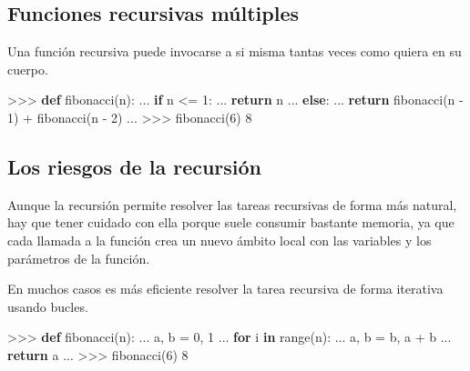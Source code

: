 \documentclass[
  spanish,
  a4paper,
]{scrreport}
\newenvironment{Shaded}{\begin{snugshade}}{\end{snugshade}}
\newcommand{\BuiltInTok}[1]{\textcolor[rgb]{0.00,0.23,0.31}{#1}}
\newcommand{\ControlFlowTok}[1]{\textcolor[rgb]{0.00,0.23,0.31}{\textbf{#1}}}
\newcommand{\DecValTok}[1]{\textcolor[rgb]{0.68,0.00,0.00}{#1}}
\newcommand{\KeywordTok}[1]{\textcolor[rgb]{0.00,0.23,0.31}{\textbf{#1}}}
\newcommand{\NormalTok}[1]{\textcolor[rgb]{0.00,0.23,0.31}{#1}}
\newcommand{\OperatorTok}[1]{\textcolor[rgb]{0.37,0.37,0.37}{#1}}
\begin{document}
\subsection{Funciones recursivas
múltiples}\label{funciones-recursivas-muxfaltiples}

Una función recursiva puede invocarse a si misma tantas veces como
quiera en su cuerpo.

\begin{Shaded}
\begin{Highlighting}[]
\OperatorTok{\textgreater{}\textgreater{}\textgreater{}} \KeywordTok{def}\NormalTok{ fibonacci(n):}
\NormalTok{...     }\ControlFlowTok{if}\NormalTok{ n }\OperatorTok{\textless{}=} \DecValTok{1}\NormalTok{:}
\NormalTok{...         }\ControlFlowTok{return}\NormalTok{ n}
\NormalTok{...     }\ControlFlowTok{else}\NormalTok{:}
\NormalTok{...         }\ControlFlowTok{return}\NormalTok{ fibonacci(n }\OperatorTok{{-}} \DecValTok{1}\NormalTok{) }\OperatorTok{+}\NormalTok{ fibonacci(n }\OperatorTok{{-}} \DecValTok{2}\NormalTok{)}
\NormalTok{...}
\OperatorTok{\textgreater{}\textgreater{}\textgreater{}}\NormalTok{ fibonacci(}\DecValTok{6}\NormalTok{)}
\DecValTok{8}
\end{Highlighting}
\end{Shaded}

\subsection{Los riesgos de la
recursión}\label{los-riesgos-de-la-recursiuxf3n}

Aunque la recursión permite resolver las tareas recursivas de forma más
natural, hay que tener cuidado con ella porque suele consumir bastante
memoria, ya que cada llamada a la función crea un nuevo ámbito local con
las variables y los parámetros de la función.

En muchos casos es más eficiente resolver la tarea recursiva de forma
iterativa usando bucles.

\begin{Shaded}
\begin{Highlighting}[]
\OperatorTok{\textgreater{}\textgreater{}\textgreater{}} \KeywordTok{def}\NormalTok{ fibonacci(n):}
\NormalTok{...     a, b }\OperatorTok{=} \DecValTok{0}\NormalTok{, }\DecValTok{1}
\NormalTok{...     }\ControlFlowTok{for}\NormalTok{ i }\KeywordTok{in} \BuiltInTok{range}\NormalTok{(n):}
\NormalTok{...         a, b }\OperatorTok{=}\NormalTok{ b, a }\OperatorTok{+}\NormalTok{ b}
\NormalTok{...     }\ControlFlowTok{return}\NormalTok{ a}
\NormalTok{...}
\OperatorTok{\textgreater{}\textgreater{}\textgreater{}}\NormalTok{ fibonacci(}\DecValTok{6}\NormalTok{)}
\DecValTok{8}
\end{Highlighting}
\end{Shaded}
\end{document}
